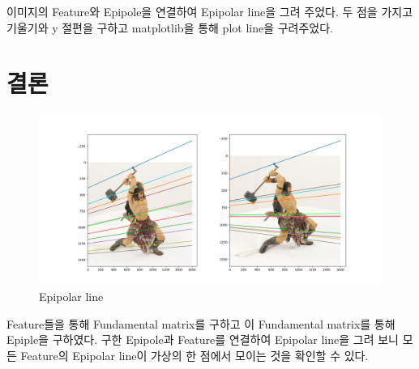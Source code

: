 \documentclass[]{report}
\begin{document}
이미지의 Feature와 Epipole을 연결하여 Epipolar line을 그려 주었다. 
두 점을 가지고 기울기와 y 절편을 구하고 matplotlib을 통해 plot line을 구려주었다. \\

\chapter{결론}

\begin{figure}[ht!]
    \centering
    \includegraphics[width=1.0\textwidth]{image/result.png}
    \caption{Epipolar line}
    \label{Epipolar}
\end{figure}

Feature들을 통해 Fundamental matrix를 구하고 이 Fundamental matrix를 통해 Epiple을 구하였다. 
구한 Epipole과 Feature를 연결하여 Epipolar line을 그려 보니 모든 Feature의 Epipolar line이 가상의 한 점에서 모이는 것을 확인할 수 있다.  \\
\end{document}
